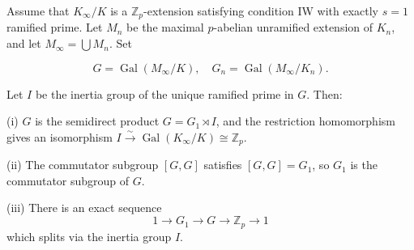 Assume that $K_\infty / K$ is a $\mathbb{Z}_p$-extension satisfying condition IW with exactly $s = 1$ ramified prime. Let $M_n$ be the maximal $p$-abelian unramified extension of $K_n$, and let $M_\infty = \bigcup M_n$. Set

$$G = \operatorname{Gal}(M_\infty / K), \quad G_n = \operatorname{Gal}(M_\infty / K_n).$$

Let $I$ be the inertia group of the unique ramified prime in $G$. Then:

(i) $G$ is the semidirect product $G = G_1 \rtimes I$, and the restriction homomorphism gives an isomorphism $I \xrightarrow{\sim} \operatorname{Gal}(K_\infty / K) \cong \mathbb{Z}_p$.

(ii) The commutator subgroup $[G, G]$ satisfies $[G, G] = G_1$, so $G_1$ is the commutator subgroup of $G$.

(iii) There is an exact sequence
$$1 \to G_1 \to G \to \mathbb{Z}_p \to 1$$
which splits via the inertia group $I$.
